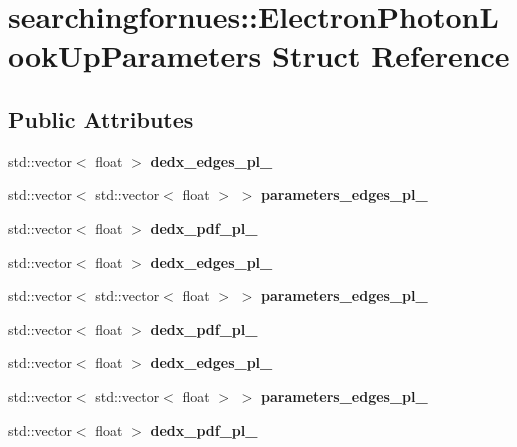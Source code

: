 \hypertarget{structsearchingfornues_1_1ElectronPhotonLookUpParameters}{}\section{searchingfornues\+:\+:Electron\+Photon\+Look\+Up\+Parameters Struct Reference}
\label{structsearchingfornues_1_1ElectronPhotonLookUpParameters}
\subsection*{Public Attributes}
\begin{DoxyCompactItemize}
\item 
std\+::vector$<$ float $>$ {\bfseries dedx\+\_\+edges\+\_\+pl\+\_}
\item 
std\+::vector$<$ std\+::vector$<$ float $>$ $>$ {\bfseries parameters\+\_\+edges\+\_\+pl\+\_}
\item 
std\+::vector$<$ float $>$ {\bfseries dedx\+\_\+pdf\+\_\+pl\+\_}\hypertarget{structsearchingfornues_1_1ElectronPhotonLookUpParameters_adb7f84f33c9396430a94ca7c6f440ac9}{}\label{structsearchingfornues_1_1ElectronPhotonLookUpParameters_adb7f84f33c9396430a94ca7c6f440ac9}

\item 
std\+::vector$<$ float $>$ {\bfseries dedx\+\_\+edges\+\_\+pl\+\_}
\item 
std\+::vector$<$ std\+::vector$<$ float $>$ $>$ {\bfseries parameters\+\_\+edges\+\_\+pl\+\_}
\item 
std\+::vector$<$ float $>$ {\bfseries dedx\+\_\+pdf\+\_\+pl\+\_}\hypertarget{structsearchingfornues_1_1ElectronPhotonLookUpParameters_a1d4132019fad2a1ce5fc8ea1b2818894}{}\label{structsearchingfornues_1_1ElectronPhotonLookUpParameters_a1d4132019fad2a1ce5fc8ea1b2818894}

\item 
std\+::vector$<$ float $>$ {\bfseries dedx\+\_\+edges\+\_\+pl\+\_}
\item 
std\+::vector$<$ std\+::vector$<$ float $>$ $>$ {\bfseries parameters\+\_\+edges\+\_\+pl\+\_}
\item 
std\+::vector$<$ float $>$ {\bfseries dedx\+\_\+pdf\+\_\+pl\+\_}\hypertarget{structsearchingfornues_1_1ElectronPhotonLookUpParameters_a74bf70a28056660ca34051c721ebfd52}{}\label{structsearchingfornues_1_1ElectronPhotonLookUpParameters_a74bf70a28056660ca34051c721ebfd52}

\end{DoxyCompactItemize}


